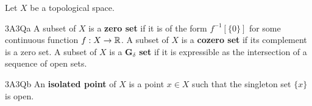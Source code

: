  Let $X$ be a topological space.

\spheader 3A3Qa A subset of $X$ is a {\bf zero set} if it is of the
form $f^{-1}[\{0\}]$ for some continuous function $f:X\to\Bbb R$.   A
subset of $X$ is a {\bf cozero set} if its complement is a zero set.
A subset of $X$ is a {\bf G$_{\delta}$ set}
if it is expressible as the intersection of a sequence of open sets.

\spheader 3A3Qb An {\bf isolated point} of $X$ is a point $x\in X$ such
that the singleton set $\{x\}$ is open.

\discrpage

